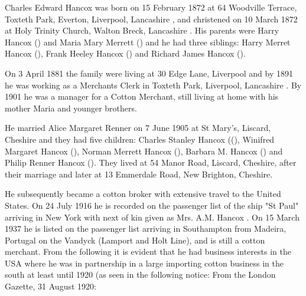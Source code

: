 
Charles Edward Hancox was born on 15 February 1872 at 64 Woodville Terrace, Toxteth Park, Everton, Liverpool, Lancashire \cite{CEHancoxBirth},  and christened on 10 March 1872 at Holy Trinity Church, Walton Breck, Lancashire \cite{CEHancoxBaptism}. His parents were Harry Hancox () and Maria Mary Merrett () and he had three siblings: Harry Merret Hancox (), Frank Heeley Hancox () and Richard James Hancox ().


On 3 April 1881 the family were living at 30 Edge Lane, Liverpool \cite{CEHancoxResidence} and by 1891 he was working as a Merchants Clerk in Toxteth Park, Liverpool, Lancashire \cite{CEHancoxOccupation1}.
By 1901 he was a manager for a Cotton Merchant, still living at home with his mother Maria and younger brothers. 

He married Alice Margaret Renner on 7 June 1905 at St Mary's, Liscard, Cheshire \cite{CEHancoxMarriage} and they had five children:  Charles Stanley Hancox ((), Winifred Margaret Hancox (), Norman Merrett Hancox (), Barbara M. Hancox () and Philip Renner Hancox ().
They lived at 54 Manor Road, Liscard, Cheshire, after their marriage\cite{CharlesEdwardHancoxHouse} and later at 13 Emmerdale Road, New Brighton, Cheshire. 

He subsequently became a cotton broker with extensive travel to the United States.  On 24 July 1916 he is recorded on the passenger list of the ship "St Paul" arriving in New York with next of kin given as Mrs. A.M. Hancox \cite{CEHancoxTravel}. On 15 March 1937 he is listed on the passenger list arriving in Southampton from Madeira, Portugal on the Vandyck (Lamport and Holt Line), and is still a cotton merchant. From the following it is evident that he had business interests in the USA where he was in partnership in a large importing cotton business in the south \cite{CEHancoxOccupation2} at least until 1920 (as seen in the following notice:
From the London Gazette, 31 August 1920:

